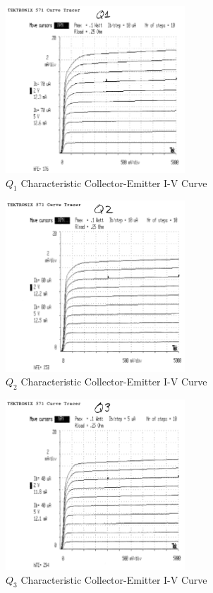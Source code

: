 \documentclass[titlepage, letterpaper, 10.5pt]{article}
\begin{document}
\begin{figure}[ht]
	\centering
	\includegraphics[width=0.6\textwidth]{results/q1-characteristics}
	\caption{$Q_{1}$ Characteristic Collector-Emitter I-V Curve}
\end{figure}

\begin{figure}[ht]
	\centering
	\includegraphics[width=0.6\textwidth]{results/q2-characteristics}
	\caption{$Q_{2}$ Characteristic Collector-Emitter I-V Curve}
\end{figure}

\begin{figure}[ht]
	\centering
	\includegraphics[width=0.6\textwidth]{results/q3-characteristics}
	\caption{$Q_{3}$ Characteristic Collector-Emitter I-V Curve}
\end{figure}
\end{document}
